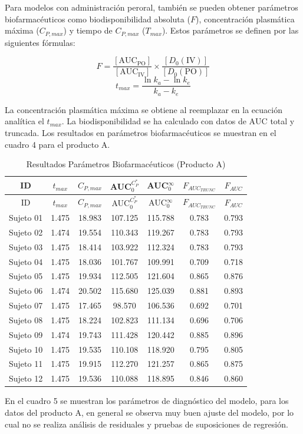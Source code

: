 \documentclass[]{article}
\begin{document}
Para modelos con administración peroral, también se pueden obtener
parámetros biofarmacéuticos como biodisponibilidad absoluta (\(F\)),
concentración plasmática máxima (\(C_{P, max}\)) y tiempo de
\(C_{P, max}\) (\(T_{max}\)). Estos parámetros se definen por las
siguientes fórmulas:

\[F = \frac{\left [ \textrm{AUC}_{\textrm{PO}}\right ]}{\left [ \textrm{AUC}_{\textrm{IV}}\right ]} \times \frac{\left [D_{0}(\textrm{IV})\right ]}{\left [D_{0}(\textrm{PO})\right ]}\]
\[t_{max} = \frac{\ln{k_{a}}-\ln{k_{e}}}{k_{a}-k_{e}}\]

La concentración plasmática máxima se obtiene al reemplazar en la
ecuación analítica el \(t_{max}\). La biodisponibilidad se ha calculado
con datos de \(\textrm{AUC}\) total y truncada. Los resultados en
parámetros biofarmacéuticos se muestran en el cuadro 4 para el producto
A.

\begin{longtable}[]{@{}ccccccc@{}}
\caption{Resultados Parámetros Biofarmacéuticos (Producto
A)}\tabularnewline
\toprule
ID & \(t_{max}\) & \(C_{P,max}\) & AUC\(_{0}^{C_{P}^{*}}\) &
AUC\(_{0}^{\infty}\) & \(F_{AUC_{TRUNC}}\) & \(F_{AUC}\)\tabularnewline
\midrule
\endfirsthead
\toprule
ID & \(t_{max}\) & \(C_{P,max}\) & AUC\(_{0}^{C_{P}^{*}}\) &
AUC\(_{0}^{\infty}\) & \(F_{AUC_{TRUNC}}\) & \(F_{AUC}\)\tabularnewline
\midrule
\endhead
Sujeto 01 & 1.475 & 18.983 & 107.125 & 115.788 & 0.783 &
0.793\tabularnewline
Sujeto 02 & 1.474 & 19.554 & 110.343 & 119.267 & 0.783 &
0.793\tabularnewline
Sujeto 03 & 1.475 & 18.414 & 103.922 & 112.324 & 0.783 &
0.793\tabularnewline
Sujeto 04 & 1.475 & 18.036 & 101.767 & 109.991 & 0.709 &
0.718\tabularnewline
Sujeto 05 & 1.475 & 19.934 & 112.505 & 121.604 & 0.865 &
0.876\tabularnewline
Sujeto 06 & 1.474 & 20.502 & 115.680 & 125.039 & 0.881 &
0.893\tabularnewline
Sujeto 07 & 1.475 & 17.465 & 98.570 & 106.536 & 0.692 &
0.701\tabularnewline
Sujeto 08 & 1.475 & 18.224 & 102.823 & 111.134 & 0.696 &
0.706\tabularnewline
Sujeto 09 & 1.474 & 19.743 & 111.428 & 120.442 & 0.885 &
0.896\tabularnewline
Sujeto 10 & 1.475 & 19.535 & 110.108 & 118.920 & 0.795 &
0.805\tabularnewline
Sujeto 11 & 1.475 & 19.915 & 112.270 & 121.257 & 0.865 &
0.875\tabularnewline
Sujeto 12 & 1.475 & 19.536 & 110.088 & 118.895 & 0.846 &
0.860\tabularnewline
\bottomrule
\end{longtable}

En el cuadro 5 se muestran los parámetros de diagnóstico del modelo,
para los datos del producto A, en general se observa muy buen ajuste del
modelo, por lo cual no se realiza análisis de residuales y pruebas de
suposiciones de regresión.
\end{document}

